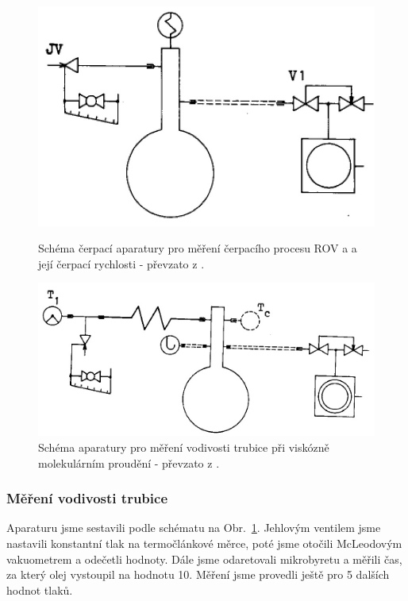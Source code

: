 \documentclass[english]{article}
\begin{document}
				\begin{figure}[h!]
				\centering
				\begin{minipage}[t]{.40\textwidth}
				  \centering
								\includegraphics[scale=0.27]{../att/sch_cerpaci_rychlost}
								\caption{Schéma čerpací aparatury pro měření čerpacího procesu ROV a a její čerpací rychlosti - převzato z \cite{bib:praskripta}.}
								\label{schema1}
				\end{minipage}%
				\hfill
				\begin{minipage}[t]{.50\textwidth}
				  \centering
								\includegraphics[scale=0.33]{../att/sch_vodivost_trubice}
								\caption{Schéma aparatury pro měření vodivosti trubice při viskózně molekulárním proudění - převzato z \cite{bib:praskripta}.}
								\label{schema2}
				\end{minipage}
				\end{figure}
	
	\subsubsection{Měření vodivosti trubice}
	Aparaturu jsme sestavili podle schématu na Obr.~\ref{schema2}. Jehlovým ventilem jsme nastavili konstantní tlak na termočlánkové měrce, poté jsme otočili McLeodovým vakuometrem a odečetli hodnoty. Dále jsme odaretovali mikrobyretu a měřili čas, za který olej vystoupil na hodnotu 10. Měření jsme provedli ještě pro 5 dalších hodnot tlaků.
\end{document}
